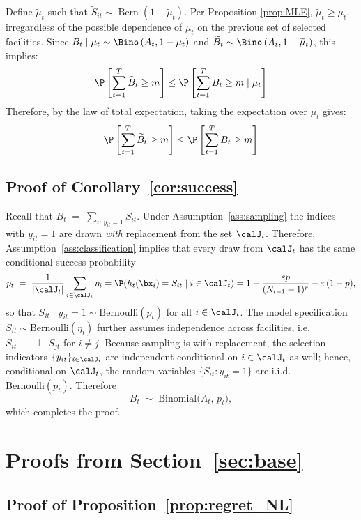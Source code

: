 \documentclass[blindrev]{informs3noheader}
\DeclareMathOperator{\Bern}{Bern}
\begin{document}
Define $\widetilde\mu_t$ such that $\widetilde{S}_{it} \sim \Bern(1-\widetilde\mu_t)$. Per Proposition \ref{prop:MLE}, $\widetilde\mu_t\geq  \mu_t$, irregardless of the possible dependence of $\mu_t$ on the previous set of selected facilities. Since $B_t \mid \mu_t \sim \Bino\left(A_t, 1-\mu_t\right)$ and $\widetilde{B}_t \sim \Bino\left(A_t, 1-\widetilde\mu_t\right)$, this implies:
\[\P\left[\sum_{t=1}^T\widetilde{B}_t\geq m \right] \leq \P\left[\sum_{t=1}^TB_t\geq m \mid \mu_t \right]\]
Therefore, by the law of total expectation, taking the expectation over $\mu_t$ gives:
\[\P\left[\sum_{t=1}^T\widetilde{B}_t\geq m \right] \leq \P\left[\sum_{t=1}^TB_t\geq m \right]\]

\subsection{Proof of Corollary~\ref{cor:success}}

Recall that $B_t \;=\; \sum_{i:\,y_{it}=1} S_{it}$. Under Assumption~\ref{ass:sampling} the indices with $y_{it}=1$ are drawn
\emph{with} replacement from the set
$\calJ_t$. Therefore, Assumption~\ref{ass:classification} implies that every draw from
$\calJ_t$ has the same conditional success probability
\[
p_t \;=\; \frac{1}{|\calJ_t|} \sum_{i \in \calJ_t} \eta_i = \P(h_t(\bx_i) = S_{it} \mid i \in \calJ_t)=1-\frac{\varepsilon p}{(N_{t-1}+1)^{r}}-\varepsilon\,(1-p),
\]
so that $S_{it} \mid y_{it} = 1 \sim \text{Bernoulli}(p_t)$ for all $i\in\calJ_t$.
The model specification $S_{it} \sim \text{Bernoulli}(\eta_i)$ further
assumes independence across facilities, i.e.\ $S_{it}\;\perp \!\!\! \perp\;S_{jt}$ for
$i\neq j$.
Because sampling is with replacement, the selection indicators
$\{y_{it}\}_{i\in\calJ_t}$ are independent conditional on $i \in \calJ_t$ as well; hence, conditional on
$\calJ_t$, the random variables
$\{S_{it}:y_{it}=1\}$ are i.i.d.\ $\text{Bernoulli}(p_t)$.
Therefore
\[
B_t \;\sim\; \text{Binomial}\bigl(A_t,\,p_t\bigr),
\]
which completes the proof.
\hfill\Halmos

\section{Proofs from Section~\ref{sec:base}}
\label{app:base}

\subsection{Proof of Proposition~\ref{prop:regret_NL}}
\label{app:regret_NL}
\end{document}
